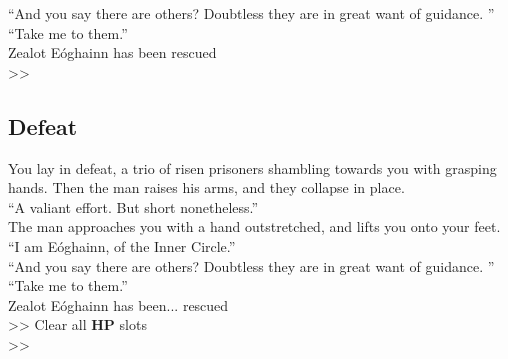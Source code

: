 “And you say there are others? Doubtless they are in great want of guidance. ”\\

“Take me to them.”\\

 Zealot Eóghainn has been rescued\\
>> 

\subsection*{Defeat}
You lay in defeat, a trio of risen prisoners shambling towards you with grasping hands. Then the man raises his arms, and they collapse in place.\\

“A valiant effort. But short nonetheless.”\\

The man approaches you with a hand outstretched, and lifts you onto your feet.\\

“I am Eóghainn, of the Inner Circle.”\\

“And you say there are others? Doubtless they are in great want of guidance. ”\\

“Take me to them.”\\

 Zealot Eóghainn has been... rescued\\
>> Clear all \textbf{HP} slots\\
>> 